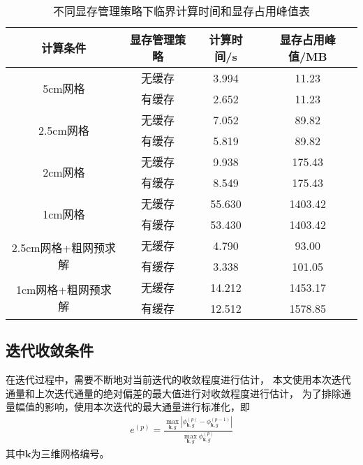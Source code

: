 \begin{table}
\centering
\caption{不同显存管理策略下临界计算时间和显存占用峰值表}
\label{tab:program.cached_alloc}
\begin{tabular}{cccc}
\toprule
计算条件 & 显存管理策略 & 计算时间/s & 显存占用峰值/MB\\
\midrule
\multirow{2}{*}{5cm网格}
 & 无缓存 & 3.994 & 11.23\\
 & 有缓存 & 2.652 & 11.23\\
\multirow{2}{*}{2.5cm网格}
 & 无缓存 & 7.052 & 89.82\\
 & 有缓存 & 5.819 & 89.82\\
\multirow{2}{*}{2cm网格}
 & 无缓存 & 9.938 & 175.43\\
 & 有缓存 & 8.549 & 175.43\\
\multirow{2}{*}{1cm网格}
 & 无缓存 & 55.630 & 1403.42\\
 & 有缓存 & 53.430 & 1403.42\\

\multirow{2}{*}{2.5cm网格+粗网预求解}
 & 无缓存 & 4.790 & 93.00\\
 & 有缓存 & 3.338 & 101.05\\
\multirow{2}{*}{1cm网格+粗网预求解}
 & 无缓存 & 14.212 & 1453.17\\
 & 有缓存 & 12.512 & 1578.85\\
\bottomrule
\end{tabular}
\end{table}

\subsection{迭代收敛条件}

在迭代过程中，需要不断地对当前迭代的收敛程度进行估计，
本文使用本次迭代通量和上次迭代通量的绝对偏差的最大值进行对收敛程度进行估计，
为了排除通量幅值的影响，使用本次迭代的最大通量进行标准化，即
\begin{align}
e^{(p)}=\frac{\displaystyle \max_{\bm{k},g}\left|\phi_{\bm{k},g}^{(p)}-\phi_{\bm{k},g}^{(p-1)}\right|}
         {\displaystyle \max_{\bm{k},g}\phi_{\bm{k},g}^{(p)}}
\end{align}
其中$\bm{k}$为三维网格编号。
